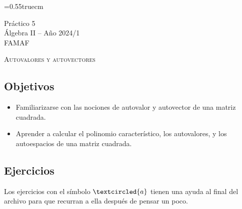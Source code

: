 \documentclass[a4paper,12pt,twoside,spanish,reqno]{amsbook}
\numberwithin{equation}{section}
\begin{document}
    \baselineskip=0.55truecm %

    {\bf \begin{center} Práctico 5 \\ Álgebra  II -- Año 2024/1 \\ FAMAF \end{center}}

	
	\centerline{\textsc{Autovalores y autovectores}}
	
	
\subsection*{Objetivos}
	
\begin{itemize}
\item Familiarizarse con las nociones de autovalor y autovector de una matriz cuadrada.

\item Aprender a calcular el polinomio característico, los autovalores, y los autoespacios de una matriz cuadrada.
\end{itemize}
	
	
\subsection*{Ejercicios} Los ejercicios con el símbolo $\textcircled{a}$ tienen una ayuda al final del archivo para que recurran a ella después de pensar un poco.
\end{document}
